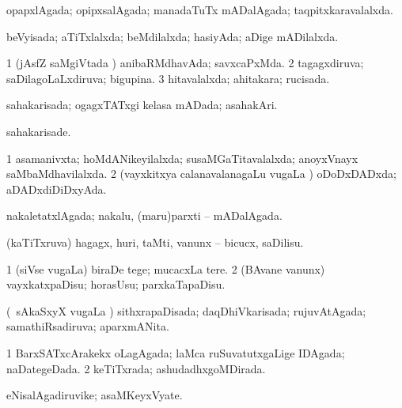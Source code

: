 \bentry
{} 
\gl{\gu}
\expl{}
\bmng
 opapxlAgada; opipxsalAgada; manadaTuTx mADalAgada; taqpitxkaravalalxda. 
\emng
\eentry

\bentry
{} 
\gl{\gu}
\expl{}
\bmng
 beVyisada; aTiTxlalxda; beMdilalxda; hasiyAda; aDige mADilalxda. 
\emng
\eentry

\bentry
{} 
\gl{\gu}
\bmng
\bnum
\num{1} (jAsfZ saMgiVtada \vi) anibaRMdhavAda; savxcaPxMda. 
\num{2} tagagxdiruva; saDilagoLaLxdiruva; bigupina. 
\num{3} hitavalalxda; ahitakara; rucisada. 
\enum
\emng
\eentry

\bentry
{} 
\gl{\gu}
\expl{}
\bmng
 sahakarisada; ogagxTATxgi kelasa mADada; asahakAri. 
\emng
\eentry

\bentry
{} 
\gl{\kirxvi}
\expl{}
\bmng
 sahakarisade. 
\emng
\eentry

\bentry
{} 
\gl{\gu}
\expl{}
\bmng
\bnum
\num{1} asamanivxta; hoMdANikeyilalxda; susaMGaTitavalalxda; anoyxVnayx saMbaMdhavilalxda. 
\num{2} (vayxkitxya calanavalanagaLu \mo vugaLa \vi) oDoDxDADxda; aDADxdiDiDxyAda. 
\enum
\emng
\eentry

\bentry
{} 
\gl{\gu}
\expl{}
\bmng
nakaletatxlAgada; nakalu, (maru)parxti -- mADalAgada. 
\emng
\eentry

\bentry
{} 
\gl{\sakirx}
\expl{}
\bmng
 (kaTiTxruva) hagagx, huri, taMti, \mo vanunx -- bicucx, saDilisu. 
\emng
\eentry

\bentry
{} 
\gl{\sakirx}
\expl{}
\bmng
\bnum
\num{1} (siVse \mo vugaLa) biraDe tege; mucacxLa tere. 
\num{2} (BAvane \mo vanunx) vayxkatxpaDisu; horasUsu; parxkaTapaDisu. 
\enum
\emng
\eentry

\bentry
{} 
\gl{\gu}
\expl{}
\bmng
 (\kanmu\ sAkaSxyX \mo vugaLa \vi) sithxrapaDisada; daqDhiVkarisada; rujuvAtAgada; samathiRsadiruva; aparxmANita. 
\emng
\eentry

\bentry
{} 
\gl{\gu}
\expl{}
\bmng
\bnum
\num{1} BarxSATxcArakekx oLagAgada; laMca ruSuvatutxgaLige IDAgada; naDategeDada. 
\num{2} keTiTxrada; ashudadhxgoMDirada. 
\enum
\emng
\eentry

\bentry
{} 
\gl{\nA}
\expl{}
\bmng
 eNisalAgadiruvike; asaMKeyxVyate. 
\emng
\eentry

